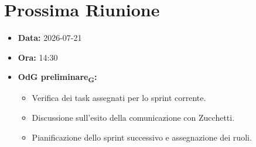 \section{Prossima Riunione}
\begin{itemize}
	\item \textbf{Data:} 2026-07-21
	\item \textbf{Ora:} 14:30
	\item \textbf{OdG preliminare\textsubscript{G}:}
	\begin{itemize}
		\item Verifica dei task assegnati per lo sprint corrente.
		\item Discussione sull'esito della comunicazione con Zucchetti.
		\item Pianificazione dello sprint successivo e assegnazione dei ruoli.
	\end{itemize}
\end{itemize}

